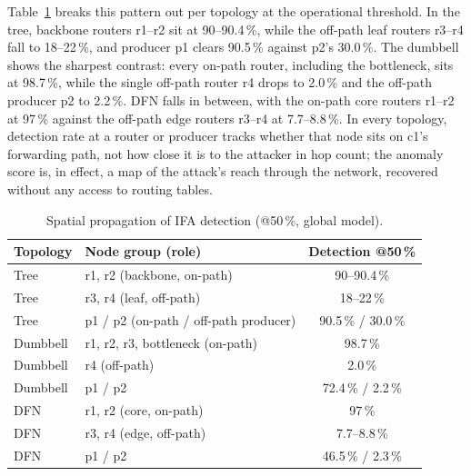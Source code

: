 Table~\ref{tab:emu-spatial} breaks this pattern out per topology at the operational threshold. In the tree, backbone routers r1--r2 sit at 90--90.4\,\%, while the off-path leaf routers r3--r4 fall to 18--22\,\%, and producer p1 clears 90.5\,\% against p2's 30.0\,\%. The dumbbell shows the sharpest contrast: every on-path router, including the bottleneck, sits at 98.7\,\%, while the single off-path router r4 drops to 2.0\,\% and the off-path producer p2 to 2.2\,\%. DFN falls in between, with the on-path core routers r1--r2 at 97\,\% against the off-path edge routers r3--r4 at 7.7--8.8\,\%. In every topology, detection rate at a router or producer tracks whether that node sits on c1's forwarding path, not how close it is to the attacker in hop count; the anomaly score is, in effect, a map of the attack's reach through the network, recovered without any access to routing tables.

\begin{table}[t]
\centering
\caption{Spatial propagation of IFA detection (@50\,\%, global model).}
\label{tab:emu-spatial}
\begin{tabular}{@{}llc@{}}
\toprule
\textbf{Topology} & \textbf{Node group (role)} & \textbf{Detection @50\,\%} \\
\midrule
Tree     & r1, r2 (backbone, on-path)      & 90--90.4\,\% \\
Tree     & r3, r4 (leaf, off-path)         & 18--22\,\% \\
Tree     & p1 / p2 (on-path / off-path producer) & 90.5\,\% / 30.0\,\% \\
Dumbbell & r1, r2, r3, bottleneck (on-path) & 98.7\,\% \\
Dumbbell & r4 (off-path)                    & 2.0\,\% \\
Dumbbell & p1 / p2                          & 72.4\,\% / 2.2\,\% \\
DFN      & r1, r2 (core, on-path)           & 97\,\% \\
DFN      & r3, r4 (edge, off-path)          & 7.7--8.8\,\% \\
DFN      & p1 / p2                          & 46.5\,\% / 2.3\,\% \\
\bottomrule
\end{tabular}
\end{table}

